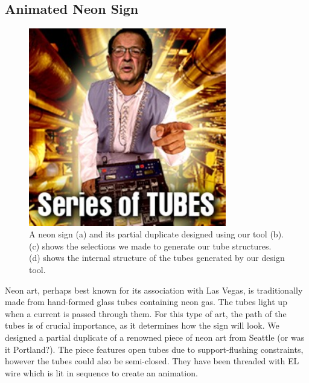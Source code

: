 \subsection{Animated Neon Sign}

\begin{figure}[h]
\centering
    \includegraphics[width=3.4in]{figures/series-of-tubes.jpg}
\caption{A neon sign (a) and its partial duplicate designed using our tool (b).  (c) shows the selections we made to generate our tube structures.  (d) shows the internal structure of the tubes generated by our design tool.}
\label{fig:neon}
\end{figure}

Neon art, perhaps best known for its association with Las Vegas, is traditionally made from hand-formed glass tubes containing neon gas.  The tubes light up when a current is passed through them.  For this type of art, the path of the tubes is of crucial importance, as it determines how the sign will look.  We designed a partial duplicate of a renowned piece of neon art from Seattle (or was it Portland?).  The piece features open tubes due to support-flushing constraints, however the tubes could also be semi-closed.  They have been threaded with EL wire which is lit in sequence to create an animation.